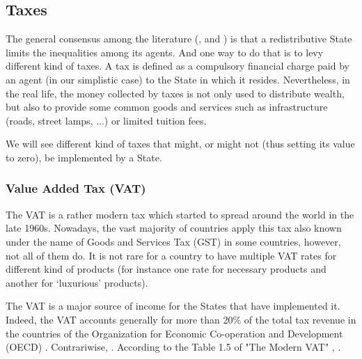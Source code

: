 \subsection{Taxes}

    The general consensus among the literature (\cite{burman2012taxes}, \cite{leigh2008redistributive} and \cite{taxes_inequalities}) is that a redistributive State limits the inequalities among its agents. And one way to do that is to levy different kind of taxes. A tax is defined as a compulsory financial charge paid by an agent (in our simplistic case) to the State in which it resides. 
    Nevertheless, in the real life, the money collected by taxes is not only used to distribute wealth, but also to provide some common goods and services such as infrastructure (roads, street lamps, ...) or limited tuition fees.
    
    We will see different kind of taxes that might, or might not (thus setting its value to zero), be implemented by a State.

    \subsubsection{Value Added Tax (VAT)}
    
    The VAT is a rather modern tax which started to spread around the world in the late 1960s. Nowadays, the vast majority of countries apply this tax also known under the name of Goods and Services Tax (GST) in some countries, however, not all of them do. It is not rare for a country to have multiple VAT rates for different kind of products (for instance one rate for necessary products and another for `luxurious' products).
    
    The VAT is a major source of income for the States that have implemented it. Indeed, the VAT accounts generally for more than 20\% of the total tax revenue in the countries of the Organization for Economic Co-operation and Development (OECD) \cite{TheModernVAT}. Contrariwise,  \cite{OriginOfVAT}. According to the Table 1.5 of "The Modern VAT" \cite{TheModernVAT}, . 
    
